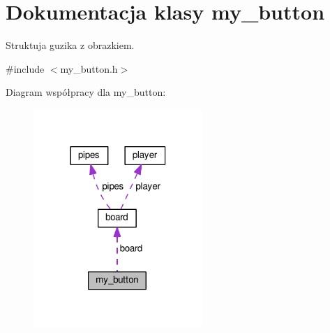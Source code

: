\hypertarget{structmy__button}{}\section{Dokumentacja klasy my\+\_\+button}
\label{structmy__button}


Struktuja guzika z obrazkiem.  




{\ttfamily \#include $<$my\+\_\+button.\+h$>$}



Diagram współpracy dla my\+\_\+button\+:
\nopagebreak
\begin{figure}[H]
\begin{center}
\leavevmode
\includegraphics[width=182pt]{structmy__button__coll__graph}
\end{center}
\end{figure}
